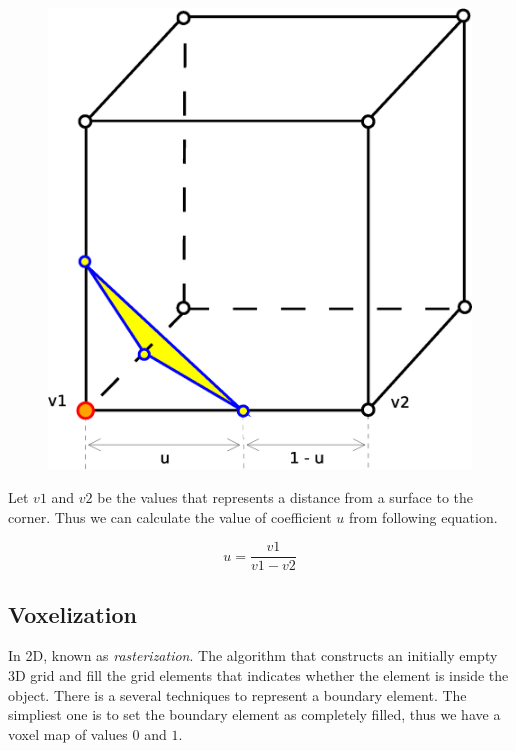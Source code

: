 \begin{figure}[ht]
\centering
\includegraphics[scale=0.35]{../img/marc_cub_inter.eps}
\label{fig:mc_interpolation}
\end{figure}

Let $v1$ and $v2$ be the values that represents a distance from a surface to the corner.
Thus we can calculate the value of coefficient $u$ from following equation.

\begin{equation}
u = \frac{v1}{v1-v2}
\end{equation}


\subsection{Voxelization}

In 2D, known as \emph{rasterization}. The algorithm that constructs an initially empty 3D grid and fill 
the
grid elements that indicates whether the element is inside the object. There is a several techniques
to represent a boundary element. The simpliest one is to set the boundary element as completely filled, 
thus we have a voxel map of values $0$ and $1$.\\

